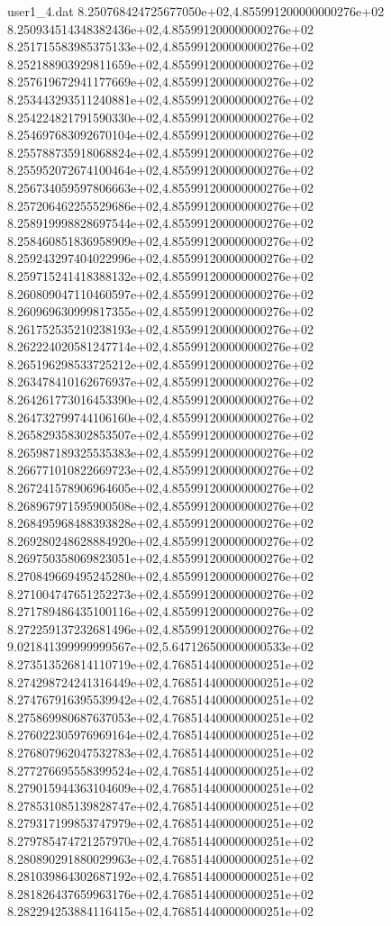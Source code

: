 \begin{filecontents}{user1_4.dat}
8.250768424725677050e+02,4.855991200000000276e+02
8.250934514348382436e+02,4.855991200000000276e+02
8.251715583985375133e+02,4.855991200000000276e+02
8.252188903929811659e+02,4.855991200000000276e+02
8.257619672941177669e+02,4.855991200000000276e+02
8.253443293511240881e+02,4.855991200000000276e+02
8.254224821791590330e+02,4.855991200000000276e+02
8.254697683092670104e+02,4.855991200000000276e+02
8.255788735918068824e+02,4.855991200000000276e+02
8.255952072674100464e+02,4.855991200000000276e+02
8.256734059597806663e+02,4.855991200000000276e+02
8.257206462255529686e+02,4.855991200000000276e+02
8.258919998828697544e+02,4.855991200000000276e+02
8.258460851836958909e+02,4.855991200000000276e+02
8.259243297404022996e+02,4.855991200000000276e+02
8.259715241418388132e+02,4.855991200000000276e+02
8.260809047110460597e+02,4.855991200000000276e+02
8.260969630999817355e+02,4.855991200000000276e+02
8.261752535210238193e+02,4.855991200000000276e+02
8.262224020581247714e+02,4.855991200000000276e+02
8.265196298533725212e+02,4.855991200000000276e+02
8.263478410162676937e+02,4.855991200000000276e+02
8.264261773016453390e+02,4.855991200000000276e+02
8.264732799744106160e+02,4.855991200000000276e+02
8.265829358302853507e+02,4.855991200000000276e+02
8.265987189325535383e+02,4.855991200000000276e+02
8.266771010822669723e+02,4.855991200000000276e+02
8.267241578906964605e+02,4.855991200000000276e+02
8.268967971595900508e+02,4.855991200000000276e+02
8.268495968488393828e+02,4.855991200000000276e+02
8.269280248628884920e+02,4.855991200000000276e+02
8.269750358069823051e+02,4.855991200000000276e+02
8.270849669495245280e+02,4.855991200000000276e+02
8.271004747651252273e+02,4.855991200000000276e+02
8.271789486435100116e+02,4.855991200000000276e+02
8.272259137232681496e+02,4.855991200000000276e+02
9.021841399999999567e+02,5.647126500000000533e+02
8.273513526814110719e+02,4.768514400000000251e+02
8.274298724241316449e+02,4.768514400000000251e+02
8.274767916395539942e+02,4.768514400000000251e+02
8.275869980687637053e+02,4.768514400000000251e+02
8.276022305976969164e+02,4.768514400000000251e+02
8.276807962047532783e+02,4.768514400000000251e+02
8.277276695558399524e+02,4.768514400000000251e+02
8.279015944363104609e+02,4.768514400000000251e+02
8.278531085139828747e+02,4.768514400000000251e+02
8.279317199853747979e+02,4.768514400000000251e+02
8.279785474721257970e+02,4.768514400000000251e+02
8.280890291880029963e+02,4.768514400000000251e+02
8.281039864302687192e+02,4.768514400000000251e+02
8.281826437659963176e+02,4.768514400000000251e+02
8.282294253884116415e+02,4.768514400000000251e+02

\end{filecontents}
